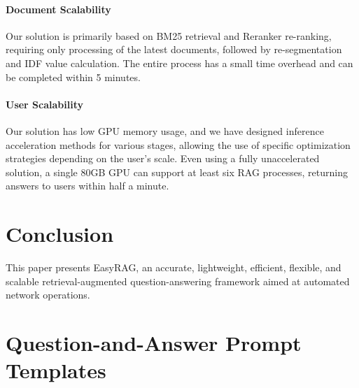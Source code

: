 \documentclass[11pt]{article}
\begin{document}
\paragraph{Document Scalability} Our solution is primarily based on BM25 retrieval and Reranker re-ranking, requiring only processing of the latest documents, followed by re-segmentation and IDF value calculation. The entire process has a small time overhead and can be completed within 5 minutes.

\paragraph{User Scalability} Our solution has low GPU memory usage, and we have designed inference acceleration methods for various stages, allowing the use of specific optimization strategies depending on the user's scale. Even using a fully unaccelerated solution, a single 80GB GPU can support at least six RAG processes, returning answers to users within half a minute.

\section{Conclusion}
This paper presents EasyRAG, an accurate, lightweight, efficient, flexible, and scalable retrieval-augmented question-answering framework aimed at automated network operations.




%


\appendix

\section{Question-and-Answer Prompt Templates}
\end{document}
